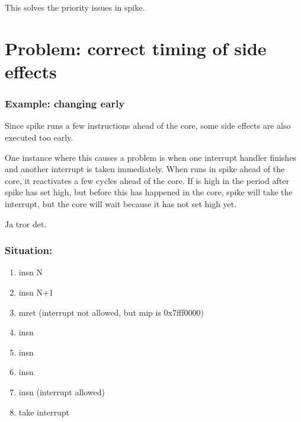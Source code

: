 This solves the priority issues in spike.



\section{Problem: correct timing of side effects}

\subsubsection{Example:  changing  early}

Since spike runs a few instructions ahead of the core, some side effects are also executed too early.

One instance where this causes a problem is when one interrupt handler finishes and another interrupt is taken immediately. When  runs in spike ahead of the core, it reactivates  a few cycles ahead of the core. If  is high in the period after spike has set  high, but before this has happened in the core, spike will take the interrupt, but the core will wait because it has not set  high yet.


 Ja tror det. 



\subsubsection{Situation:}
\begin{enumerate}
    \item insn N
    \item insn N+1
    \item mret (interrupt not allowed, but mip is 0x7fff0000)
    \item insn
    \item insn
    \item insn
    \item insn (interrupt allowed)
    \item take interrupt
\end{enumerate}

